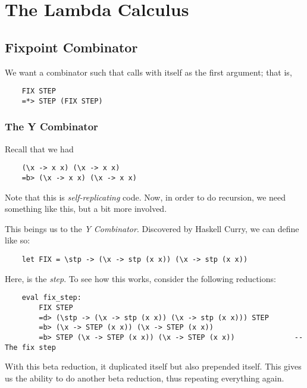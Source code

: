 \documentclass[letterpaper]{article}
\begin{document}
\section{The Lambda Calculus}

\subsection{Fixpoint Combinator}
We want a combinator  such that  calls  with itself as the first argument; that is, 
\begin{verbatim}
    FIX STEP 
    =*> STEP (FIX STEP)
\end{verbatim}


\subsubsection{The Y Combinator}
Recall that we had 
\begin{verbatim}
    (\x -> x x) (\x -> x x)
    =b> (\x -> x x) (\x -> x x)
\end{verbatim}
Note that this is \emph{self-replicating} code. Now, in order to do recursion, we need something like this, but a bit more involved. 

\bigskip 

This beings us to the \emph{Y Combinator}. Discovered by Haskell Curry, we can define  like so: 
\begin{verbatim}
    let FIX = \stp -> (\x -> stp (x x)) (\x -> stp (x x))
\end{verbatim}
Here,  is the \emph{step}. To see how this works, consider the following reductions: 
\begin{verbatim}
    eval fix_step:
        FIX STEP 
        =d> (\stp -> (\x -> stp (x x)) (\x -> stp (x x))) STEP 
        =b> (\x -> STEP (x x)) (\x -> STEP (x x))
        =b> STEP (\x -> STEP (x x)) (\x -> STEP (x x))              -- The fix step 
\end{verbatim}
With this beta reduction, it duplicated itself but also prepended itself. This gives us the ability to do another beta reduction, thus repeating everything again.


\newpage 
\end{document}
